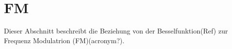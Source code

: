 %
%
% 
%
\chapter{FM\label{chapter:fm}}
\begin{refsection}


Dieser Abschnitt beschreibt die Beziehung von der Besselfunktion(Ref) zur Frequenz Modulatrion (FM)(acronym?).








\printbibliography[heading=subbibliography]
\end{refsection}

%
